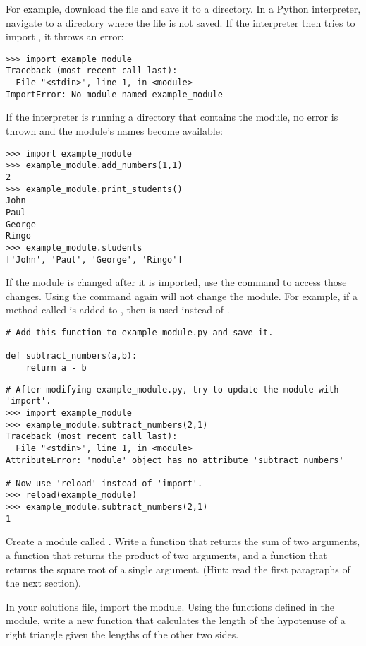 For example, download the file  and save it to a directory.
In a Python interpreter, navigate to a directory where the file is not saved.
If the interpreter then tries to import , it throws an error:

\begin{lstlisting}
>>> import example_module
Traceback (most recent call last):
  File "<stdin>", line 1, in <module>
ImportError: No module named example_module
\end{lstlisting}

If the interpreter is running a directory that contains the module, no error is thrown and the module's names become available:

\begin{lstlisting}
>>> import example_module
>>> example_module.add_numbers(1,1)
2
>>> example_module.print_students()
John
Paul
George
Ringo
>>> example_module.students
['John', 'Paul', 'George', 'Ringo']
\end{lstlisting}

If the module is changed after it is imported, use the  command to access those changes.
Using the  command again will not change the module.
For example, if a method called  is added to , then  is used instead of .

\begin{lstlisting}
# Add this function to example_module.py and save it.

def subtract_numbers(a,b):
	return a - b
\end{lstlisting}

\begin{lstlisting}
# After modifying example_module.py, try to update the module with 'import'.
>>> import example_module
>>> example_module.subtract_numbers(2,1)
Traceback (most recent call last):
  File "<stdin>", line 1, in <module>
AttributeError: 'module' object has no attribute 'subtract_numbers'

# Now use 'reload' instead of 'import'.
>>> reload(example_module)
>>> example_module.subtract_numbers(2,1)
1
\end{lstlisting}

\begin{problem}
Create a module called .
Write a function that returns the sum of two arguments, a function that returns the product of two arguments, and a function that returns the square root of a single argument.
(Hint: read the first paragraphs of the next section).

In your solutions file, import the  module.
Using the functions defined in the module, write a new function that calculates the length of the hypotenuse of a right triangle given the lengths of the other two sides.
\end{problem}

